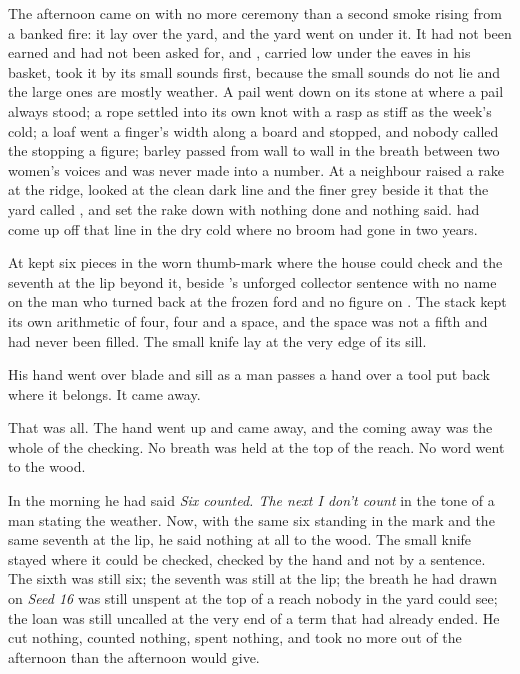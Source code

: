 The afternoon came on with no more ceremony than a second smoke rising from a banked fire: it lay over the yard, and the yard went on under it. It had not been earned and had not been asked for, and , carried low under the eaves in his basket, took it by its small sounds first, because the small sounds do not lie and the large ones are mostly weather. A pail went down on its stone at  where a pail always stood; a rope settled into its own knot with a rasp as stiff as the week's cold; a loaf went a finger's width along a board and stopped, and nobody called the stopping a figure; barley passed from wall to wall in the breath between two women's voices and was never made into a number. At  a neighbour raised a rake at the ridge, looked at the clean dark line and the finer grey beside it that the yard called , and set the rake down with nothing done and nothing said.  had come up off that line in the dry cold where no broom had gone in two years.

At   kept six pieces in the worn thumb-mark where the house could check and the seventh at the lip beyond it, beside 's unforged collector sentence with no name on the man who turned back at the frozen ford and no figure on . The stack kept its own arithmetic of four, four and a space, and the space was not a fifth and had never been filled. The small knife lay at the very edge of its sill.

His hand went over blade and sill as a man passes a hand over a tool put back where it belongs. It came away.

That was all. The hand went up and came away, and the coming away was the whole of the checking. No breath was held at the top of the reach. No word went to the wood.

In the morning he had said \emph{Six counted. The next I don't count} in the tone of a man stating the weather. Now, with the same six standing in the mark and the same seventh at the lip, he said nothing at all to the wood. The small knife stayed where it could be checked, checked by the hand and not by a sentence. The sixth was still six; the seventh was still at the lip; the breath he had drawn on \emph{Seed 16} was still unspent at the top of a reach nobody in the yard could see; the loan was still uncalled at the very end of a term that had already ended. He cut nothing, counted nothing, spent nothing, and took no more out of the afternoon than the afternoon would give.

